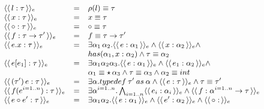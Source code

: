 \documentclass[a4paper,8pt]{article}
\newcommand{\constre}[1]{\ensuremath{\langle\langle\,#1\,\rangle\rangle_{e}}}
\begin{document}
     \begin{figure}[h]
       \[\small{
            \begin{array}{lcl}
                \constre{l : \tau} & = & \rho(l) \equiv \tau\\
                \constre{x : \tau} & = & x \equiv \tau \\
                \constre{\circ : \tau} & = & \circ \equiv \tau \\
                \constre{f : \tau\to \tau'} & = & f \equiv
                                                        \tau\to
                                                        \tau' \\
                \constre{e.x : \tau} & = & \exists
                                          \alpha_1\,\alpha_2. \constre{e
                                          : \alpha_1} \land \constre{x
                                          : \alpha_2} \land \\
                          & & has(\alpha_1,x:\alpha_2) \land \tau
                              \equiv \alpha_2\\
                \constre{e[e_1] : \tau} & = & \exists
                                         \alpha_1\alpha_2\alpha_3. \constre{e:\alpha_1}
                                             \land\constre{e_1: \alpha_2}\land\\
                         & & \alpha_1\equiv\star\,\alpha_3 \land \tau
                             \equiv\alpha_3 \land \alpha_2 \equiv int\\
                \constre{(\tau')\,e:\tau} & = & \exists \alpha. typedef\:\tau'\:as\:\alpha\land\constre{e : \tau} \land
                                               \tau \equiv \tau'\\
                \constre{f(e^{i=1..n}) : \tau} & = & \exists
                                                    \alpha^{i=1..n}. \bigwedge_{i=1..n}\constre{e_i:\alpha_i}
                                                    \land \constre{f :
                                                    \alpha^{i=1..n}
                                                    \to \tau} \\
                     \constre{e \circ e' : \tau} & = & \exists
                                                      \alpha_1\alpha_2.\constre{e
                                                      :\alpha_1} \land
                                                      \constre{e' :
                                                      \alpha_2} \land
                                                      \constre{\circ :
}
\end{array}}\]
\end{figure}
\end{document}
